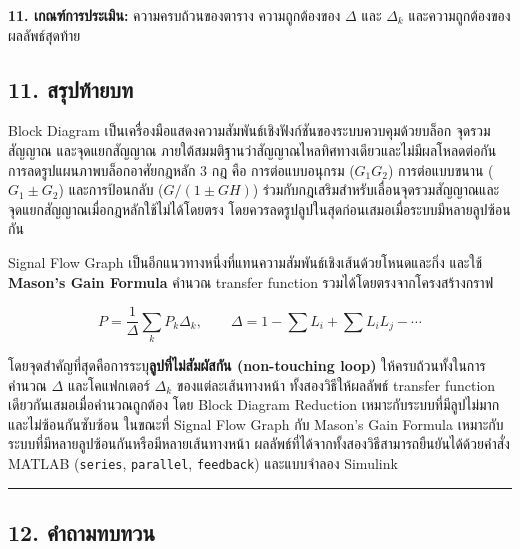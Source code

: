 \textbf{11. เกณฑ์การประเมิน:} ความครบถ้วนของตาราง ความถูกต้องของ $\Delta$ และ $\Delta_k$ และความถูกต้องของผลลัพธ์สุดท้าย


\subsection{11. สรุปท้ายบท}

Block Diagram เป็นเครื่องมือแสดงความสัมพันธ์เชิงฟังก์ชันของระบบควบคุมด้วยบล็อก จุดรวมสัญญาณ และจุดแยกสัญญาณ ภายใต้สมมติฐานว่าสัญญาณไหลทิศทางเดียวและไม่มีผลโหลดต่อกัน การลดรูปแผนภาพบล็อกอาศัยกฎหลัก 3 กฎ คือ การต่อแบบอนุกรม ($G_1G_2$) การต่อแบบขนาน ($G_1\pm G_2$) และการป้อนกลับ ($G/(1\pm GH)$) ร่วมกับกฎเสริมสำหรับเลื่อนจุดรวมสัญญาณและจุดแยกสัญญาณเมื่อกฎหลักใช้ไม่ได้โดยตรง โดยควรลดรูปลูปในสุดก่อนเสมอเมื่อระบบมีหลายลูปซ้อนกัน

Signal Flow Graph เป็นอีกแนวทางหนึ่งที่แทนความสัมพันธ์เชิงเส้นด้วยโหนดและกิ่ง และใช้ \textbf{Mason's Gain Formula} คำนวณ transfer function รวมได้โดยตรงจากโครงสร้างกราฟ

\[
P = \frac{1}{\Delta}\sum_k P_k\Delta_k, \qquad \Delta = 1-\sum L_i+\sum L_iL_j-\cdots
\]

โดยจุดสำคัญที่สุดคือการระบุ\textbf{ลูปที่ไม่สัมผัสกัน (non-touching loop)} ให้ครบถ้วนทั้งในการคำนวณ $\Delta$ และโคแฟกเตอร์ $\Delta_k$ ของแต่ละเส้นทางหน้า ทั้งสองวิธีให้ผลลัพธ์ transfer function เดียวกันเสมอเมื่อคำนวณถูกต้อง โดย Block Diagram Reduction เหมาะกับระบบที่มีลูปไม่มากและไม่ซ้อนกันซับซ้อน ในขณะที่ Signal Flow Graph กับ Mason's Gain Formula เหมาะกับระบบที่มีหลายลูปซ้อนกันหรือมีหลายเส้นทางหน้า ผลลัพธ์ที่ได้จากทั้งสองวิธีสามารถยืนยันได้ด้วยคำสั่ง MATLAB (\texttt{series}, \texttt{parallel}, \texttt{feedback}) และแบบจำลอง Simulink

\par\noindent\rule{\textwidth}{0.4pt}\par

\subsection{12. คำถามทบทวน}

